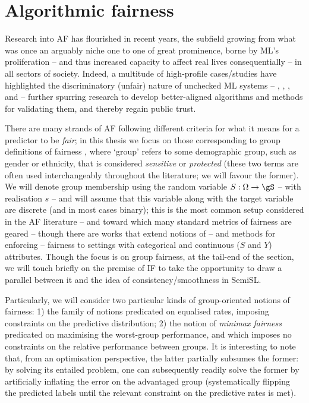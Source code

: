 \section{Algorithmic fairness}\label{sec:fairml}
Research into \acf{AF} has flourished in recent years, the subfield growing from what was once an
arguably niche one to one of great prominence, borne by \ac{ML}'s proliferation -- and thus
increased capacity to affect real lives consequentially -- in all sectors of society.
%
Indeed, a multitude of high-profile cases/studies have highlighted the discriminatory (unfair)
nature of unchecked \ac{ML} systems -- \cite{kasperkevic2015google}, \cite{angwin2016machine},
\cite{dastin2018amazon}, and \cite{buolamwini2018gender} -- further spurring research to develop
better-aligned algorithms and methods for validating them, and thereby regain public trust.

%
There are many strands of \ac{AF} following different criteria for what it means for a
predictor to be \emph{fair}; in this thesis we focus on those corresponding to group definitions of
fairness \citep{barocas2019fairness}, where `group' refers to some demographic group, such as
gender or ethnicity, that is considered \emph{sensitive} or \emph{protected} (these two terms are
often used interchangeably throughout the literature; we will favour the former).
%
We will denote group membership using the random variable \( S: \Omega \to \gS \) -- with
realisation \(s\) -- and will assume that this variable along with the target variable are discrete
(and in most cases binary); this is the most common setup considered in the \ac{AF} literature --
and toward which many standard metrics of fairness are geared \citep{feldman2015certifying,
hardt2016equality, woodworth2017learning} -- though there are works that extend notions of -- and
methods for enforcing -- fairness to settings with categorical and continuous (\( S \) and \( Y \))
attributes.
%
Though the focus is on group fairness, at the tail-end of the section, we will touch briefly on the
premise of \ac{IF} \citep{dwork2012fairness} to take the opportunity to draw a parallel
between it and the idea of consistency/smoothness in \ac{SemiSL}.

%
Particularly, we will consider two particular kinds of group-oriented notions of fairness: 1) the
family of notions predicated on equalised rates, imposing constraints on the predictive
distribution; 2) the notion of \emph{minimax fairness} predicated on maximising the worst-group
performance, and which imposes no constraints on the relative performance between groups.
%
It is interesting to note that, from an optimisation perspective, the latter partially subsumes the
former: by solving its entailed problem, one can subsequently readily solve the former by
artificially inflating the error on the advantaged group (systematically flipping the predicted
labels until the relevant constraint on the predictive rates is met).


